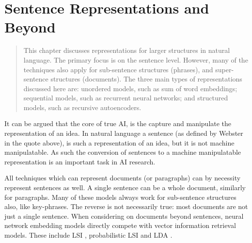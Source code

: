 \documentclass[12pt,parskip]{komatufte}
\begin{document}
\chapter{Sentence Representations and Beyond}\label{sec:sentence-representations-and-beyond}
\begin{abstract}
	This chapter discusses representations for larger structures in natural language.
	The primary focus is on the sentence level.
	However, many of the techniques also apply for sub-sentence structures (phrases), and super-sentence structures (documents).
	The three main types of representations discussed here are: unordered models, such as sum of word embeddings; sequential models, such as recurrent neural networks; and structured models, such as recursive autoencoders.
\end{abstract}




It can be argued that the core of true AI,
is the capture and manipulate the representation of an idea.
In natural language a sentence (as defined by Webster in the quote above),
is such a representation of an idea, but it is not machine manipulatable.
As such the conversion of sentences to a machine manipulatable representation is an important task in AI research.


All techniques which can represent documents (or paragraphs) can by necessity represent sentences as well.
A single sentence can be a whole document, similarly for paragraphs.
Many of these models always work for sub-sentence structures also, like key-phrases.
The reverse is not necessarily true: most documents are not just a single sentence.
When considering on documents beyond sentences,
neural network embedding models directly compete with vector information retrieval models.
These include LSI , probabilistic LSI  and  LDA .
\end{document}
